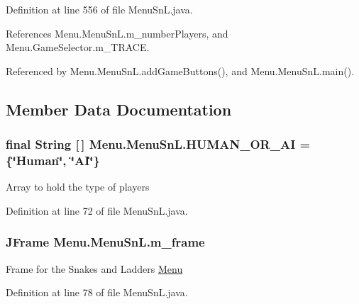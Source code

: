 Definition at line 556 of file Menu\+Sn\+L.\+java.



References Menu.\+Menu\+Sn\+L.\+m\+\_\+number\+Players, and Menu.\+Game\+Selector.\+m\+\_\+\+T\+R\+A\+C\+E.



Referenced by Menu.\+Menu\+Sn\+L.\+add\+Game\+Buttons(), and Menu.\+Menu\+Sn\+L.\+main().



\subsection{Member Data Documentation}
\hypertarget{class_menu_1_1_menu_sn_l_a7cd650c1f3cf334aafb3be5b3ad1b158}{}
\subsubsection[{H\+U\+M\+A\+N\+\_\+\+O\+R\+\_\+\+A\+I}]{\setlength{\rightskip}{0pt plus 5cm}final String \mbox{[}$\,$\mbox{]} Menu.\+Menu\+Sn\+L.\+H\+U\+M\+A\+N\+\_\+\+O\+R\+\_\+\+A\+I = \{\char`\"{}Human\char`\"{}, \char`\"{}A\+I\char`\"{}\}\hspace{0.3cm}{\ttfamily [private]}}\label{class_menu_1_1_menu_sn_l_a7cd650c1f3cf334aafb3be5b3ad1b158}
Array to hold the type of players 

Definition at line 72 of file Menu\+Sn\+L.\+java.

\hypertarget{class_menu_1_1_menu_sn_l_af43a9353bb0cfe3d29fa37d67b794a65}{}
\subsubsection[{m\+\_\+frame}]{\setlength{\rightskip}{0pt plus 5cm}J\+Frame Menu.\+Menu\+Sn\+L.\+m\+\_\+frame\hspace{0.3cm}{\ttfamily [private]}}\label{class_menu_1_1_menu_sn_l_af43a9353bb0cfe3d29fa37d67b794a65}
Frame for the Snakes and Ladders \hyperlink{namespace_menu}{Menu} 

Definition at line 78 of file Menu\+Sn\+L.\+java.

\hypertarget{class_menu_1_1_menu_sn_l_ac45af15bf2aabd1916063700e1e44f08}{}
